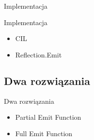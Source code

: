 \documentclass{beamer}
\begin{document}
\begin{frame}{}
\begin{center}
\huge{Implementacja}
\end{center}
\end{frame}

\begin{frame}{Implementacja}
\begin{itemize}
	\item CIL
	\item Reflection.Emit
\end{itemize}
\end{frame}

\subsection*{Dwa rozwiązania}

\begin{frame}{Dwa rozwiązania}
\begin{itemize}
	\item Partial Emit Function
	\item Full Emit Function
\end{itemize}
\end{frame}
\end{document}
